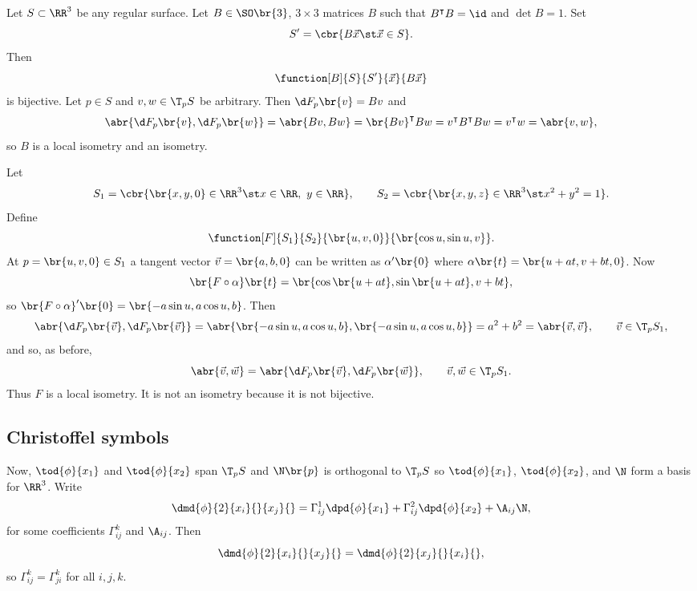 \begin{example*}
Let $ S \subset \RR^3 $ be any regular surface. Let $ B \in \SO\br{3} $, $ 3 \times 3 $ matrices $ B $ such that $ B^\intercal B = \id $ and $ \det B = 1 $. Set
$$ S' = \cbr{B\vec{x} \st \vec{x} \in S}. $$
Then
$$ \function[B]{S}{S'}{\vec{x}}{B\vec{x}} $$
is bijective. Let $ p \in S $ and $ v, w \in \T_p S $ be arbitrary. Then $ \d F_p\br{v} = Bv $ and
$$ \abr{\d F_p\br{v}, \d F_p\br{w}} = \abr{Bv, Bw} = \br{Bv}^\intercal Bw = v^\intercal B^\intercal Bw = v^\intercal w = \abr{v, w}, $$
so $ B $ is a local isometry and an isometry.
\end{example*}

\begin{example*}
Let
$$ S_1 = \cbr{\br{x, y, 0} \in \RR^3 \st x \in \RR, \ y \in \RR}, \qquad S_2 = \cbr{\br{x, y, z} \in \RR^3 \st x^2 + y^2 = 1}. $$
Define
$$ \function[F]{S_1}{S_2}{\br{u, v, 0}}{\br{\cos u, \sin u, v}}. $$
At $ p = \br{u, v, 0} \in S_1 $ a tangent vector $ \vec{v} = \br{a, b, 0} $ can be written as $ \alpha'\br{0} $ where $ \alpha\br{t} = \br{u + at, v + bt, 0} $. Now
$$ \br{F \circ \alpha}\br{t} = \br{\cos \br{u + at}, \sin \br{u + at}, v + bt}, $$
so $ \br{F \circ \alpha}'\br{0} = \br{-a\sin u, a\cos u, b} $. Then
$$ \abr{\d F_p\br{\vec{v}}, \d F_p\br{\vec{v}}} = \abr{\br{-a\sin u, a\cos u, b}, \br{-a\sin u, a\cos u, b}} = a^2 + b^2 = \abr{\vec{v}, \vec{v}}, \qquad \vec{v} \in \T_p S_1, $$
and so, as before,
$$ \abr{\vec{v}, \vec{w}} = \abr{\d F_p\br{\vec{v}}, \d F_p\br{\vec{w}}}, \qquad \vec{v}, \vec{w} \in \T_p S_1. $$
Thus $ F $ is a local isometry. It is not an isometry because it is not bijective.
\end{example*}

\pagebreak

\subsection{Christoffel symbols}


Now, $ \tod{\phi}{x_1} $ and $ \tod{\phi}{x_2} $ span $ \T_p S $ and $ \N\br{p} $ is orthogonal to $ \T_p S $ so $ \tod{\phi}{x_1} $, $ \tod{\phi}{x_2} $, and $ \N $ form a basis for $ \RR^3 $. Write
\begin{equation}
\label{eq:2}
\dmd{\phi}{2}{x_i}{}{x_j}{} = \Gamma_{ij}^1\dpd{\phi}{x_1} + \Gamma_{ij}^2\dpd{\phi}{x_2} + \A_{ij}\N,
\end{equation}
for some coefficients $ \Gamma_{ij}^k $ and $ \A_{ij} $. Then
$$ \dmd{\phi}{2}{x_i}{}{x_j}{} = \dmd{\phi}{2}{x_j}{}{x_i}{}, $$
so $ \Gamma_{ij}^k = \Gamma_{ji}^k $ for all $ i, j, k $.

